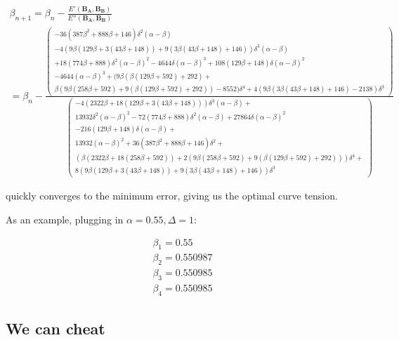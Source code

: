 \documentclass[a4paper]{article}
\begin{document}
\begin{multline}
\beta_{n+1} = \beta_n -\frac{E'(\mathbf{B_A},\mathbf{B_B})}{E''(\mathbf{B_A},\mathbf{B_B})} \\
= \beta_n - 
\frac{
\left(\begin{matrix}
-36 \left(387 \beta ^2+888 \beta +146\right) \delta ^2 (\alpha -\beta ) \\
-4 (9 \beta  (129 \beta +3 (43 \beta +148))+9 (3 \beta  (43 \beta +148)+146)) \delta ^3 (\alpha -\beta ) \\
+18 (774 \beta +888) \delta ^2 (\alpha -\beta )^2-4644 \delta  (\alpha -\beta )^3+108 (129 \beta +148) \delta  (\alpha -\beta )^2 \\
-4644 (\alpha -\beta )^3+(9 \beta  (\beta  (129 \beta +592)+292)+ \\
\beta  (9 \beta  (258 \beta +592)+9 (\beta  (129 \beta +592)+292))-8552) \delta ^4+4 (9 \beta  (3 \beta  (43 \beta +148)+146)-2138) \delta ^3
\end{matrix}\right)
}{\left(\begin{matrix}
-4 (2322 \beta +18 (129 \beta +3 (43 \beta +148))) \delta ^3 (\alpha -\beta )+ \\
13932 \delta ^2 (\alpha -\beta )^2-72 (774 \beta +888) \delta ^2 (\alpha -\beta )+27864 \delta  (\alpha -\beta )^2\\
-216 (129 \beta +148) \delta  (\alpha -\beta )+\\
13932 (\alpha -\beta )^2+36 \left(387 \beta ^2+888 \beta +146\right) \delta ^2+\\
(\beta  (2322 \beta +18 (258 \beta +592))+2 (9 \beta  (258 \beta +592)+9 (\beta  (129 \beta +592)+292))) \delta ^4 + \\
8 (9 \beta  (129 \beta +3 (43 \beta +148))+9 (3 \beta  (43 \beta +148)+146)) \delta ^3
\end{matrix}\right)}
\end{multline}

quickly converges to the minimum error, giving us the optimal curve tension.

As an example, plugging in $\alpha = 0.55, \Delta = 1$:

\begin{align*}
\beta_1 = 0.55 \\
\beta_2 = 0.550987 \\
\beta_3 = 0.550985 \\
\beta_4 = 0.550985
\end{align*}

\subsection{We can cheat}
\end{document}
